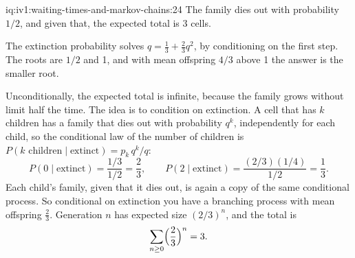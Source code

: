 \begin{solution}{iq:iv1:waiting-times-and-markov-chains:24}
The family dies out with probability $1/2$, and given that, the expected total is 3 cells.

The extinction probability solves $q = \tfrac13 + \tfrac23 q^2$, by conditioning on the first step. The roots are $1/2$ and 1, and with mean offspring $4/3$ above 1 the answer is the smaller root.

Unconditionally, the expected total is infinite, because the family grows without limit half the time. The idea is to condition on extinction. A cell that has $k$ children has a family that dies out with probability $q^k$, independently for each child, so the conditional law of the number of children is $P(k \text{ children} \mid \text{extinct}) = p_k\,q^k / q$:
\[
P(0 \mid \text{extinct}) = \frac{1/3}{1/2} = \frac23, \qquad P(2 \mid \text{extinct}) = \frac{(2/3)(1/4)}{1/2} = \frac13.
\]
Each child's family, given that it dies out, is again a copy of the same conditional process. So conditional on extinction you have a branching process with mean offspring $\tfrac23$. Generation $n$ has expected size $(2/3)^n$, and the total is
\[
\sum_{n \ge 0} \Bigl(\frac23\Bigr)^n = 3.
\]
\end{solution}

